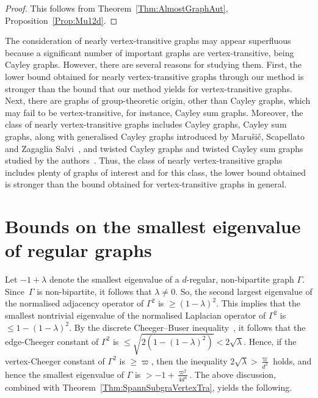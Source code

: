 \begin{proof}
This follows from Theorem~\ref{Thm:AlmostGraphAut}, Proposition~\ref{Prop:Mu12d}. 
\end{proof}

\begin{remark}
\label{Rk:NearlyVertexTra}
The consideration of nearly vertex-transitive graphs may appear superfluous because a significant number of important graphs are vertex-transitive, being Cayley graphs. However, there are several reasons for studying them. First, the lower bound obtained for nearly vertex-transitive graphs through our method is stronger than the bound that our method yields for vertex-transitive graphs. Next, there are graphs of group-theoretic origin, other than Cayley graphs, which may fail to be vertex-transitive, for instance, Cayley sum graphs. Moreover, the class of nearly vertex-transitive graphs includes Cayley graphs, Cayley sum graphs, along with generalised Cayley graphs introduced by Maru\v{s}i\v{c}, Scapellato and Zagaglia Salvi~\cite{MarusicScapellatoZagagliaSalviGeneralizedCayleyGraph}, and twisted Cayley graphs and twisted Cayley sum graphs studied by the authors~\cite{CheegerTwisted}. Thus, the class of nearly vertex-transitive graphs includes plenty of graphs of interest and for this class, the lower bound obtained is stronger than the bound obtained for vertex-transitive graphs in general. 
\end{remark}

\section{Bounds on the smallest eigenvalue of regular graphs} 

Let $-1+\lambda$ denote the smallest eigenvalue of a $d$-regular, non-bipartite graph $\Gamma$. Since~$\Gamma$ is non-bipartite, it follows that $\lambda \neq 0$. So, the second largest eigenvalue of the normalised adjacency operator of $\Gamma^2$ is $\geq (1- \lambda)^2$. This implies that the smallest nontrivial eigenvalue of the normalised Laplacian operator of $\Gamma^2$ is $\leq 1 - (1-\lambda)^2$. By the discrete Cheeger--Buser inequality~\cite[Theorem 2.2]{ChungSpectralGraphTheory}, it follows that the edge-Cheeger constant of $\Gamma^2$ is $\leq \sqrt {2 (1 - (1-\lambda)^2)} < 2\sqrt \lambda$. Hence, if the vertex-Cheeger constant of $\Gamma^2$ is $\geq \varpi$, then the inequality $2 \sqrt \lambda > \frac{\varpi}{d^2}$ holds, and hence the smallest eigenvalue of $\Gamma$ is $> -1 + \frac {\varpi^2}{4d^4}$. 
The above discussion, combined with Theorem~\ref{Thm:SpannSubgraVertexTra}, yields the following. 

